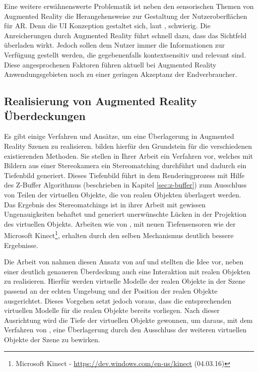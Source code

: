 Eine weitere erwähnenswerte Problematik ist neben den sensorischen Themen von Augmented Reality die Herangehensweise zur Gestaltung der Nutzeroberflächen für AR. Denn die UI Konzeption gestaltet sich, laut \citet{azuma2001recent}, schwierig. Die Anreicherungen durch Augmented Reality führt schnell dazu, dass das Sichtfeld überladen wirkt. Jedoch sollen dem Nutzer immer die Informationen zur Verfügung gestellt werden, die gegebenenfalls kontextsensitiv und relevant sind. Diese angesprochenen Faktoren führen aktuell bei Augmented Reality Anwendungsgebieten noch zu einer geringen Akzeptanz der Endverbraucher.

\subsection{Realisierung von Augmented Reality Über\-deckungen} \label{sec:ar-occlusion}

Es gibt einige Verfahren und Ansätze, um eine Überlagerung in Augmented Reality Szenen zu realisieren. \citet{wloka1995resolving} bilden hierfür den Grundstein für die verschiedenen existierenden Methoden. Sie stellen in Ihrer Arbeit ein Verfahren vor, welches mit Bildern aus einer Stereokamera ein Stereomatching durchführt und dadurch ein Tiefenbild generiert. Dieses Tiefenbild führt in dem Renderingprozess mit Hilfe des Z-Buffer Algorithmus (beschrieben in Kapitel \ref{sec:z-buffer}) zum Ausschluss von Teilen der virtuellen Objekte, die von realen Objekten überlagert werden. Das Ergebnis des Stereomatchings ist in ihrer Arbeit mit gewissen Ungenauigkeiten behaftet und generiert unerwünschte Lücken in der Projektion des virtuellen Objekts. Arbeiten wie von \citet{seo2013direct}, mit neuen Tiefensensoren wie der Microsoft Kinect\footnote{Microsoft Kinect - \url{https://dev.windows.com/en-us/kinect} (04.03.16)}, erhalten durch den selben Mechanismus deutlich bessere Ergebnisse. 

Die Arbeit von \citet{breen1996interactive} nahmen diesen Ansatz von \citet{wloka1995resolving} auf und stellten die Idee vor, neben einer deutlich genaueren Überdeckung auch eine Interaktion mit realen Objekten zu realisieren. Hierfür werden virtuelle Modelle der realen Objekte in der Szene passend an der echten Umgebung und der Position der realen Objekte ausgerichtet. Dieses Vorgehen setzt jedoch voraus, dass die entsprechenden virtuellen Modelle für die realen Objekte bereits vorliegen. Nach dieser Ausrichtung wird die Tiefe der virtuellen Objekte gewonnen, um daraus, mit dem Verfahren von \citet{wloka1995resolving}, eine Überlagerung durch den Ausschluss der weiteren virtuellen Objekte der Szene zu bewirken. 

